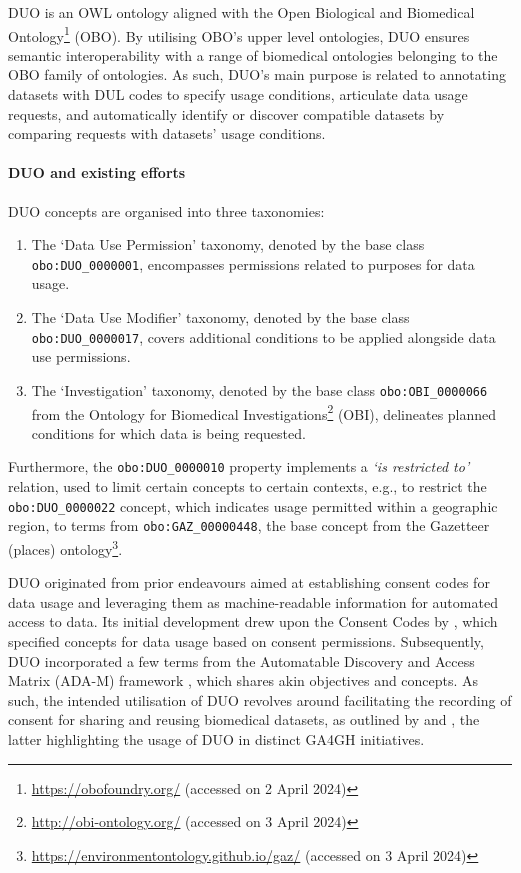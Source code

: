 DUO is an OWL ontology aligned with the Open Biological and Biomedical Ontology\footnote{\url{https://obofoundry.org/} (accessed on 2 April 2024)} (OBO).
By utilising OBO's upper level ontologies, DUO ensures semantic interoperability with a range of biomedical ontologies belonging to the OBO family of ontologies.
As such, DUO's main purpose is related to annotating datasets with DUL codes to specify usage conditions, articulate data usage requests, and automatically identify or discover compatible datasets by comparing requests with datasets' usage conditions.

\paragraph{DUO and existing efforts}
DUO concepts are organised into three taxonomies:
\begin{enumerate}
    \item The `Data Use Permission' taxonomy, denoted by the base class \texttt{obo:DUO\_0000001}, encompasses permissions related to purposes for data usage.
    \item The `Data Use Modifier' taxonomy, denoted by the base class \texttt{obo:DUO\_0000017}, covers additional conditions to be applied alongside data use permissions.
    \item The `Investigation' taxonomy, denoted by the base class \texttt{obo:OBI\_0000066} from the Ontology for Biomedical Investigations\footnote{\url{http://obi-ontology.org/} (accessed on 3 April 2024)} (OBI), delineates planned conditions for which data is being requested.
\end{enumerate}
Furthermore, the \texttt{obo:DUO\_0000010} property implements a \textit{`is restricted to'} relation, used to limit certain concepts to certain contexts, e.g., to restrict the \texttt{obo:DUO\_0000022} concept, which indicates usage permitted within a geographic region, to terms from \texttt{obo:GAZ\_00000448}, the base concept from the Gazetteer (places) ontology\footnote{\url{https://environmentontology.github.io/gaz/} (accessed on 3 April 2024)}.

DUO originated from prior endeavours aimed at establishing consent codes for data usage and leveraging them as machine-readable information for automated access to data.
Its initial development drew upon the Consent Codes by \cite{dyke_consent_2016}, which specified concepts for data usage based on consent permissions.
Subsequently, DUO incorporated a few terms from the Automatable Discovery and Access Matrix (ADA-M) framework \citep{woolley_responsible_2018}, which shares akin objectives and concepts.
As such, the intended utilisation of DUO revolves around facilitating the recording of consent for sharing and reusing biomedical datasets, as outlined by \cite{lawson_data_2021} and \cite{rehm_ga4gh_2021}, the latter highlighting the usage of DUO in distinct GA4GH initiatives.

